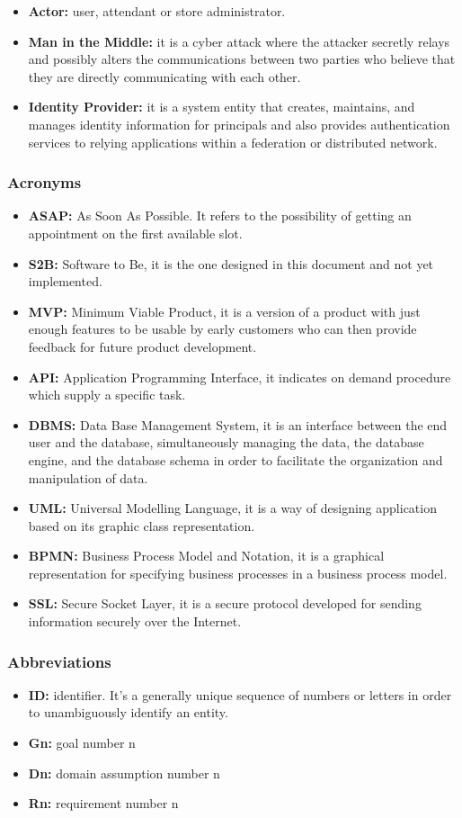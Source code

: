 \documentclass[table, 12pt]{article}
\begin{document}
\begin{itemize}
    \item \textbf{Actor:} user, attendant or store administrator.
    \item \textbf{Man in the Middle:} it is a cyber attack where the attacker secretly relays and possibly alters the communications between two parties who believe that they are directly communicating with each other.
    \item \textbf{Identity Provider:} it is a system entity that creates, maintains, and manages identity information for principals and also provides authentication services to relying applications within a federation or distributed network.
\end{itemize}
\subsubsection{Acronyms}
\begin{itemize}
    \item {\textbf{ASAP:} As Soon As Possible. It refers to the possibility of getting an appointment on the first available slot.}
    \item {\textbf{S2B:} Software to Be, it is the one designed in this document and not yet implemented.}
    \item \textbf{MVP:} Minimum Viable Product, it is a version of a product with just enough features to be usable by early customers who can then provide feedback for future product development.
    \item {\textbf{API:} Application Programming Interface, it indicates on demand procedure which supply a specific task.}
    \item \textbf{DBMS:} Data Base Management System, it is an interface between the end user and the database, simultaneously managing the data, the database engine, and the database schema in order to facilitate the organization and manipulation of data.
    \item {\textbf{UML:} Universal Modelling Language, it is a way of designing application based on its graphic class representation.}
    \item \textbf{BPMN:} Business Process Model and Notation, it is a graphical representation for specifying business processes in a business process model.
    \item \textbf{SSL:} Secure Socket Layer, it is a secure protocol developed for sending information securely over the Internet.
\end{itemize}
\subsubsection{Abbreviations}
\begin{itemize}
    \item {\textbf{ID:} identifier. It's a generally unique sequence of numbers or letters in order to unambiguously identify an entity.}
    \item {\textbf{Gn:} goal number n}
    \item \textbf{Dn:} domain assumption number n
    \item \textbf{Rn:} requirement number n
\end{itemize}
\end{document}
